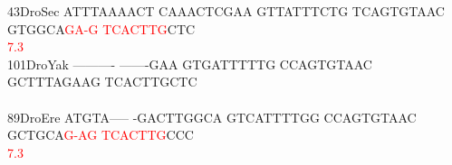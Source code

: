 \documentclass[11pt,twoside,reqno,a4paper]{article}
\begin{document}
{43\hspace*{2\charwidth}DroSec	ATTTAAAACT	CAAACTCGAA	GTTATTTCTG	TCAGTGTAAC	GTGGCA\textcolor{Red}{G}\textcolor{Red}{A}\textcolor{Red}{-}\textcolor{Red}{G}	\textcolor{Red}{T}\textcolor{Red}{C}\textcolor{Red}{A}\textcolor{Red}{C}\textcolor{Red}{T}\textcolor{Red}{T}\textcolor{Red}{G}CTC	\\
\hspace*{4\charwidth}\hspace*{7\charwidth}\hspace*{1\charwidth}\hspace*{1\charwidth}\hspace*{1\charwidth}\hspace*{1\charwidth}\hspace*{46\charwidth}\textcolor{Red}{7.3}\hspace*{1\charwidth}\hspace*{1\charwidth}\\
101\hspace*{1\charwidth}DroYak	----------	-------GAA	GTGATTTTTG	CCAGTGTAAC	GCTTTAGAAG	TCACTTGCTC	\\
\hspace*{4\charwidth}\hspace*{7\charwidth}\hspace*{1\charwidth}\hspace*{1\charwidth}\hspace*{1\charwidth}\hspace*{1\charwidth}\hspace*{1\charwidth}\hspace*{1\charwidth}\\
89\hspace*{2\charwidth}DroEre	ATGTA-----	-GACTTGGCA	GTCATTTTGG	CCAGTGTAAC	GCTGCA\textcolor{Red}{G}\textcolor{Red}{-}\textcolor{Red}{A}\textcolor{Red}{G}	\textcolor{Red}{T}\textcolor{Red}{C}\textcolor{Red}{A}\textcolor{Red}{C}\textcolor{Red}{T}\textcolor{Red}{T}\textcolor{Red}{G}CCC	\\
\hspace*{4\charwidth}\hspace*{7\charwidth}\hspace*{1\charwidth}\hspace*{1\charwidth}\hspace*{1\charwidth}\hspace*{1\charwidth}\hspace*{46\charwidth}\textcolor{Red}{7.3}\hspace*{1\charwidth}\hspace*{1\charwidth}\\
}
\end{document}
